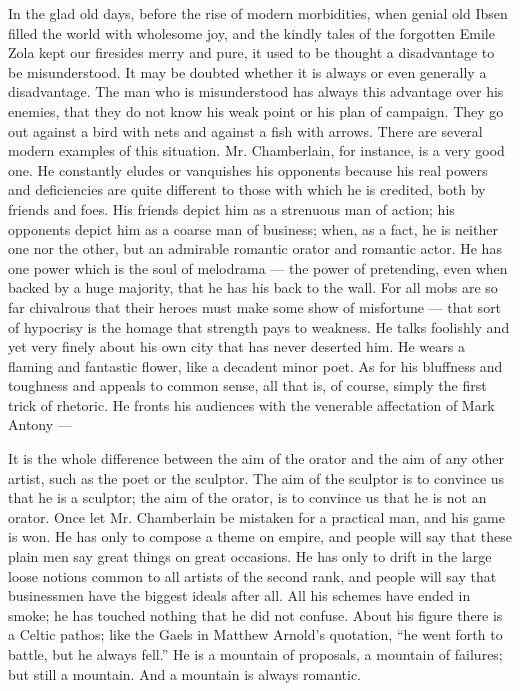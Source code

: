 In the glad old days, before the rise of modern morbidities, when genial old Ibsen filled the world with wholesome joy, and the kindly tales of the forgotten Emile Zola kept our firesides merry and pure, it used to be thought a disadvantage to be misunderstood. It may be doubted whether it is always or even generally a disadvantage. The man who is misunderstood has always this advantage over his enemies, that they do not know his weak point or his plan of campaign. They go out against a bird with nets and against a fish with arrows. There are several modern examples of this situation. Mr. Chamberlain, for instance, is a very good one. He constantly eludes or vanquishes his opponents because his real powers and deficiencies are quite different to those with which he is credited, both by friends and foes. His friends depict him as a strenuous man of action; his opponents depict him as a coarse man of business; when, as a fact, he is neither one nor the other, but an admirable romantic orator and romantic actor. He has one power which is the soul of melodrama — the power of pretending, even when backed by a huge majority, that he has his back to the wall. For all mobs are so far chivalrous that their heroes must make some show of misfortune — that sort of hypocrisy is the homage that strength pays to weakness. He talks foolishly and yet very finely about his own city that has never deserted him. He wears a flaming and fantastic flower, like a decadent minor poet. As for his bluffness and toughness and appeals to common sense, all that is, of course, simply the first trick of rhetoric. He fronts his audiences with the venerable affectation of Mark Antony —

It is the whole difference between the aim of the orator and the aim of any other artist, such as the poet or the sculptor. The aim of the sculptor is to convince us that he is a sculptor; the aim of the orator, is to convince us that he is not an orator. Once let Mr. Chamberlain be mistaken for a practical man, and his game is won. He has only to compose a theme on empire, and people will say that these plain men say great things on great occasions. He has only to drift in the large loose notions common to all artists of the second rank, and people will say that businessmen have the biggest ideals after all. All his schemes have ended in smoke; he has touched nothing that he did not confuse. About his figure there is a Celtic pathos; like the Gaels in Matthew Arnold’s quotation, “he went forth to battle, but he always fell.” He is a mountain of proposals, a mountain of failures; but still a mountain. And a mountain is always romantic.

